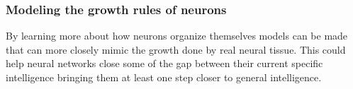 \subsubsection{Modeling the growth rules of neurons}
By learning more about how neurons organize themselves models can be made that
can more closely mimic the growth done by real neural tissue.
This could help neural networks close some of the gap between their current
specific intelligence bringing them at least one step closer to general
intelligence.
